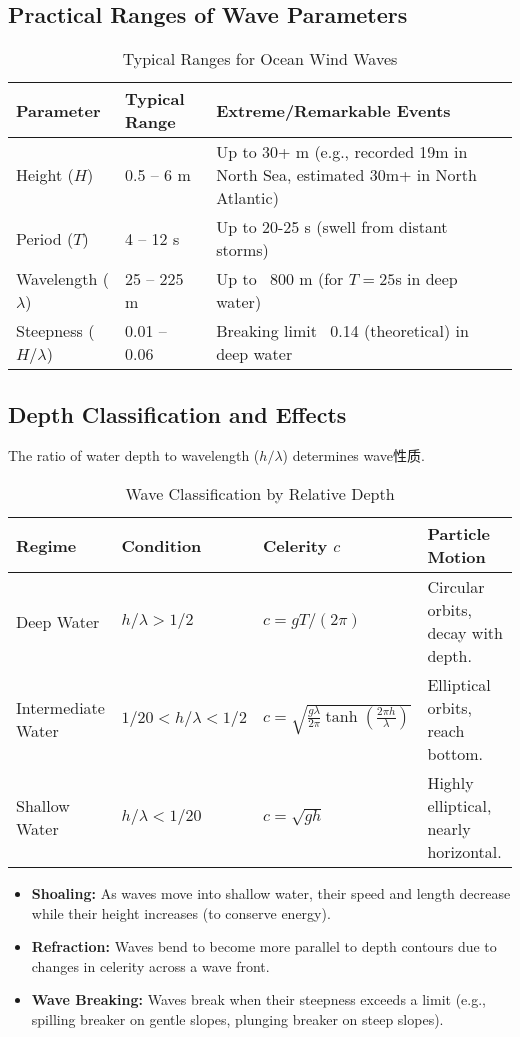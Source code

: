 \documentclass[11pt,a4paper]{article}
\begin{document}
\subsection{Practical Ranges of Wave Parameters}
\begin{table}[H]
\centering
\caption{Typical Ranges for Ocean Wind Waves}
\begin{tabular}{@{}lL{4cm}L{4cm}@{}}
\toprule
Parameter & Typical Range & Extreme/Remarkable Events \\
\midrule
Height ($H$) & 0.5 – 6 m & Up to 30+ m (e.g., recorded 19m in North Sea, estimated 30m+ in North Atlantic) \\
Period ($T$) & 4 – 12 s & Up to 20-25 s (swell from distant storms) \\
Wavelength ($\lambda$) & 25 – 225 m & Up to ~800 m (for $T=25$s in deep water) \\
Steepness ($H/\lambda$) & 0.01 – 0.06 & Breaking limit ~0.14 (theoretical) in deep water \\
\bottomrule
\end{tabular}
\end{table}

\subsection{Depth Classification and Effects}
The ratio of water depth to wavelength ($h/\lambda$) determines wave性质.
\begin{table}[H]
\centering
\caption{Wave Classification by Relative Depth}
\begin{tabular}{@{}llll@{}}
\toprule
Regime & Condition & Celerity $c$ & Particle Motion \\
\midrule
Deep Water & $h / \lambda > 1/2$ & $c = gT/(2\pi)$ & Circular orbits, decay with depth. \\
Intermediate Water & $1/20 < h/\lambda < 1/2$ & $c = \sqrt{\frac{g\lambda}{2\pi} \tanh(\frac{2\pi h}{\lambda})}$ & Elliptical orbits, reach bottom. \\
Shallow Water & $h / \lambda < 1/20$ & $c = \sqrt{gh}$ & Highly elliptical, nearly horizontal. \\
\bottomrule
\end{tabular}
\end{table}
\begin{itemize}
    \item \textbf{Shoaling:} As waves move into shallow water, their speed and length decrease while their height increases (to conserve energy).
    \item \textbf{Refraction:} Waves bend to become more parallel to depth contours due to changes in celerity across a wave front.
    \item \textbf{Wave Breaking:} Waves break when their steepness exceeds a limit (e.g., spilling breaker on gentle slopes, plunging breaker on steep slopes).
\end{itemize}
\end{document}
